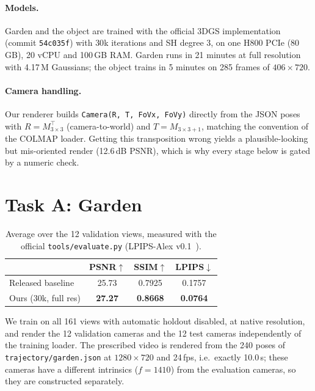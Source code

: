 \documentclass[10pt,twocolumn,letterpaper]{article}
\begin{document}
\paragraph{Models.} Garden and the object are trained with the official 3DGS implementation~\cite{kerbl2023}
(commit \texttt{54c035f}) with $30$k iterations and SH degree 3, on one H800 PCIe (80\,GB),
20 vCPU and 100\,GB RAM. Garden runs in 21 minutes at full resolution with 4.17\,M Gaussians;
the object trains in 5 minutes on 285 frames of $406\times720$.

\paragraph{Camera handling.} Our renderer builds \texttt{Camera(R, T, FoVx, FoVy)} directly from
the JSON poses with $R=M_{3\times3}^{\top}$ (camera-to-world) and $T=M_{3\times3+1}$, matching the
convention of the COLMAP loader. Getting this transposition wrong yields a plausible-looking but
mis-oriented render (12.6\,dB PSNR), which is why every stage below is gated by a numeric check.

\section{Task A: Garden}

\begin{table}[t]
\centering\small
\setlength{\tabcolsep}{4pt}
\begin{tabular}{lccc}
\hline
 & PSNR$\uparrow$ & SSIM$\uparrow$ & LPIPS$\downarrow$\\
\hline
Released baseline & 25.73 & 0.7925 & 0.1757\\
Ours (30k, full res) & \textbf{27.27} & \textbf{0.8668} & \textbf{0.0764}\\
\hline
\end{tabular}
\caption{Average over the 12 validation views, measured with the official
\texttt{tools/evaluate.py} (LPIPS-Alex v0.1~\cite{zhang2018}).}
\label{tab:garden}
\end{table}

We train on all 161 views with automatic holdout disabled, at native resolution, and render the
12 validation cameras and the 12 test cameras independently of the training loader. The
prescribed video is rendered from the 240 poses of \texttt{trajectory/garden.json} at
$1280\times720$ and 24\,fps, i.e.\ exactly 10.0\,s; these cameras have a different intrinsics
($f=1410$) from the evaluation cameras, so they are constructed separately.
\end{document}
